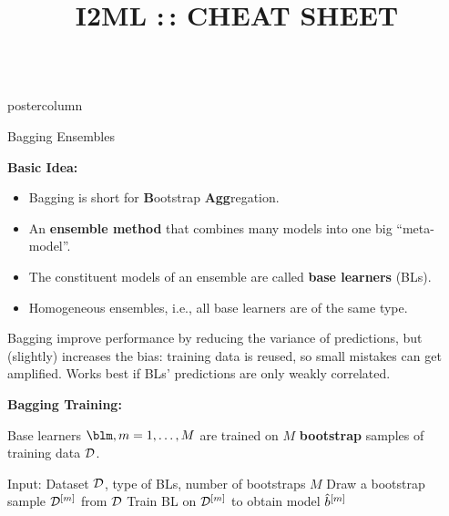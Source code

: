 \documentclass{beamer}
\title{I2ML :\,: CHEAT SHEET} %
\newlength{\columnheight} %
\begin{document}
\begin{frame}[fragile]{}
\begin{columns}
	\begin{column}{.31\textwidth}
		\begin{beamercolorbox}[center]{postercolumn}
			\begin{minipage}{.98\textwidth}
				\parbox[t][\columnheight]{\textwidth}{
					\begin{myblock}{Bagging Ensembles}

						\begin{codebox}
			\textbf{Basic Idea:}
						\end{codebox}
						\begin{itemize}[$\bullet$]     
            \setlength{\itemindent}{+.3in}
                        \item Bagging is short for \textbf{B}ootstrap \textbf{Agg}regation.
                        \item An \textbf{ensemble method} that combines many models into one 
        big \enquote{meta-model}.
                        \item The constituent models of an ensemble are called \textbf{base learners} (BLs).
                        \item Homogeneous ensembles, i.e., all base learners are of the same type.
                        \end{itemize}
            Bagging improve performance by reducing the variance of predictions, but (slightly) increases the bias: training data is reused, so small mistakes can get amplified. Works best if BLs' predictions are only weakly correlated.
						
				

						\begin{codebox}
			      \textbf{Bagging Training: }
						\end{codebox}
						Base learners $\blm, m = 1, \dots, M$ are trained on $M$ \textbf{bootstrap} samples of training data $\mathcal{D}$. 
						\begin{algorithm}[H]
              \small
              \caption{Bagging algorithm: Training}
              \begin{algorithmic}[1]
                \State Input: Dataset $\mathcal{D}$, type of BLs, number of bootstraps $M$
                  \State Draw a bootstrap sample $\mathcal{D}^{[m]}$ from $\mathcal{D}$
                  \State Train BL on $\mathcal{D}^{[m]}$ to obtain model $\hat{b}^{[m]}$
                \EndFor
              \end{algorithmic}
            \end{algorithm}


\end{myblock}}
\end{minipage}
\end{beamercolorbox}
\end{column}
\end{columns}
\end{frame}
\end{document}
